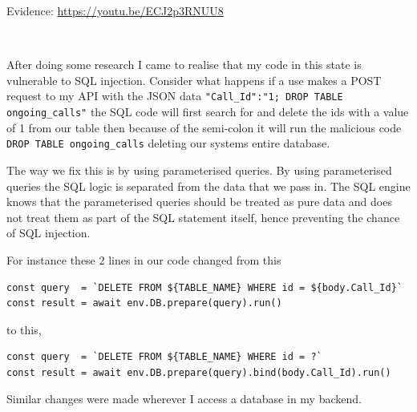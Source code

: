 {\sffamily Evidence:} \url{https://youtu.be/ECJ2p3RNUU8}\\ \vspace{0.2cm}

{\color{gray} \hrulefill} \\ \vspace{0.2cm}

After doing some research I came to realise that
my code in this state is vulnerable to SQL injection.
Consider what happens if a use makes a POST request to
my API with the JSON data
\texttt{{"Call\_Id":"1; DROP TABLE ongoing\_calls"}} the
SQL code will first search for and delete the ids with a
value of 1 from our table then because of the semi-colon
it will run the malicious code
\texttt{DROP TABLE ongoing\_calls} deleting our systems
entire database. \\ \vspace{0.2cm}

The way we fix this is by using parameterised queries.
By using parameterised queries the SQL logic is separated
from the data that we pass in. The SQL engine knows that the
parameterised queries should be treated as pure data
and does not treat them as part of the SQL statement itself,
hence preventing the chance of SQL injection. \\ \vspace{0.2cm}

For instance these 2 lines in our code changed from this

\begin{verbatim}
const query  = `DELETE FROM ${TABLE_NAME} WHERE id = ${body.Call_Id}`
const result = await env.DB.prepare(query).run()
\end{verbatim}

to this,

\begin{verbatim}
const query  = `DELETE FROM ${TABLE_NAME} WHERE id = ?`
const result = await env.DB.prepare(query).bind(body.Call_Id).run()
\end{verbatim}

Similar changes were made wherever I access a database in my
backend. \\ \vspace{0.2cm}

